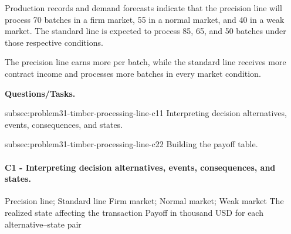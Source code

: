 	Production records and demand forecasts indicate that the precision line will process 70 batches in a firm market, 55 in a normal market, and 40 in a weak market. The standard line is expected to process 85, 65, and 50 batches under those respective conditions.
	
	The precision line earns more per batch, while the standard line receives more contract income and processes more batches in every market condition.

	\textbf{Questions/Tasks.}
	\begin{enumerate}
	\CriterionTask
	{subsec:problem31-timber-processing-line-c1}{1}
	{Interpreting decision alternatives, events, consequences, and states.}

	\CriterionTask
	{subsec:problem31-timber-processing-line-c2}{2}
	{Building the payoff table.}
	\end{enumerate}

\paragraph*{C1 - Interpreting decision alternatives, events, consequences, and states.}
	\label{subsec:problem31-timber-processing-line-c1}
	\DecisionElementsTable
	{Precision line; Standard line}
	{Firm market; Normal market; Weak market}
	{The realized state affecting the transaction}
	{Payoff in thousand USD for each alternative--state pair}

